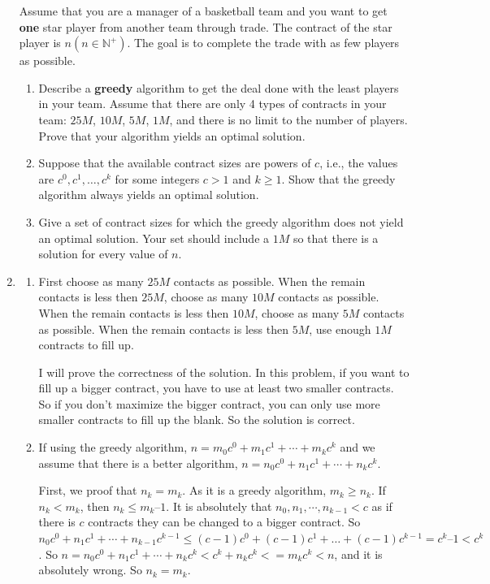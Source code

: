 \documentclass[12pt,a4paper]{article}
\makeatletter
\newtheorem*{solution}{Solution}
\theoremstyle{definition}
\renewenvironment{solution}[1][Solution] {\par\pushQED{\qed}\normalfont\topsep6\p@\@plus6\p@\relax\trivlist\item[\hskip\labelsep\bfseries#1\@addpunct{.}]\ignorespaces}{\popQED\endtrivlist\@endpefalse} \makeatother
\makeatother
\begin{document}
\begin{enumerate}
	Assume that you are a manager of a basketball team and you want to get \textbf{one} star player from another team through trade. The contract of the star player is $ n (n\in \mathbb{N}^+) $. The goal is to complete the trade with as few players as possible. 
	
	\begin{enumerate}
		\item Describe a \textbf{greedy} algorithm to get the deal done with the least players in your team. Assume that there are only 4 types of contracts in your team: $25M$, $ 10M $, $ 5M $, $ 1M $, and there is no limit to the number of players. Prove that your algorithm yields an optimal solution.
		\item Suppose that the available contract sizes are powers of $c$,
		i.e., the values are $c^{0}, c^{1}, \ldots, c^{k}$ for some integers $c>1$ and $k \geq 1$. Show that the greedy algorithm always yields an optimal solution.
		\item Give a set of contract sizes for which the greedy algorithm does not yield an optimal solution. Your set should include a $ 1M $ so that there is a solution for every value of $ n $.
	\end{enumerate}
    \begin{solution}
        \begin{enumerate}
        \item First choose as many $25M$ contacts as possible. When the remain contacts is less then $25M$, choose as many $10M$ contacts as possible. When the remain contacts is less then $10M$, choose as many $5M$ contacts as possible. When the remain contacts is less then $5M$, use enough $1M$ contracts to fill up.
        
        I will prove the correctness of the solution. In this problem, if you want to fill up a bigger contract, you have to use at least two smaller contracts. So if you don't maximize the bigger contract, you can only use more smaller contracts to fill up the blank. So the solution is correct.
        
        \item If using the greedy algorithm, $n = m_0c^0 + m_1c^1 + \cdots + m_kc^k$ and we assume that there is a better algorithm, $n = n_0c^0 + n_1c^1 + \cdots + n_kc^k$. 

First, we proof that $n_k = m_k$. As it is a greedy algorithm, $m_k \geqslant n_k$. If $n_k < m_k$, then $n_k \leqslant m_k – 1$.
It is absolutely that $n_0, n_1, \cdots, n_{k-1} < c$ as if there is $c$ contracts they can be changed to a bigger contract. So $n_0c^0 + n_1c^1 + \cdots + n_{k-1}c^{k-1} \leqslant (c - 1)c^0 + (c - 1)c^1 + … + (c - 1)c^{k-1} = c^k – 1 < c^k$. So $n = n_0c^0 + n_1c^1 + \cdots + n_kc^k < c^k + n_kc^k <= m_kc^k < n$, and it is absolutely wrong. So $n_k = m_k$.


\end{enumerate}
\end{solution}
\end{enumerate}
\end{document}
